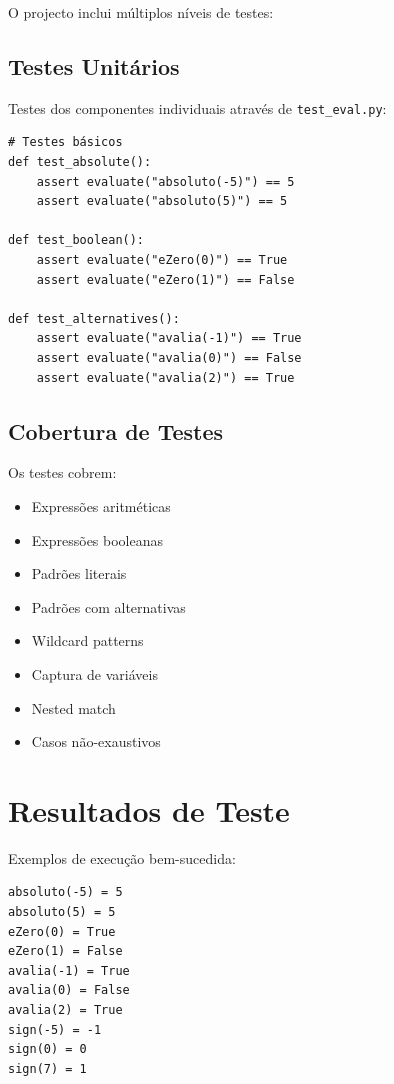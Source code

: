 \documentclass[11pt,a4paper]{report}
\begin{document}
O projecto inclui múltiplos níveis de testes:

\subsection{Testes Unitários}

Testes dos componentes individuais através de \texttt{test\_eval.py}:

\begin{lstlisting}
# Testes básicos
def test_absolute():
    assert evaluate("absoluto(-5)") == 5
    assert evaluate("absoluto(5)") == 5

def test_boolean():
    assert evaluate("eZero(0)") == True
    assert evaluate("eZero(1)") == False

def test_alternatives():
    assert evaluate("avalia(-1)") == True
    assert evaluate("avalia(0)") == False
    assert evaluate("avalia(2)") == True
\end{lstlisting}

\subsection{Cobertura de Testes}

Os testes cobrem:
\begin{itemize}
    \item Expressões aritméticas
    \item Expressões booleanas
    \item Padrões literais
    \item Padrões com alternativas
    \item Wildcard patterns
    \item Captura de variáveis
    \item Nested match
    \item Casos não-exaustivos
\end{itemize}

\section{Resultados de Teste}

Exemplos de execução bem-sucedida:

\begin{lstlisting}
absoluto(-5) = 5
absoluto(5) = 5
eZero(0) = True
eZero(1) = False
avalia(-1) = True
avalia(0) = False
avalia(2) = True
sign(-5) = -1
sign(0) = 0
sign(7) = 1
\end{lstlisting}
\end{document}
